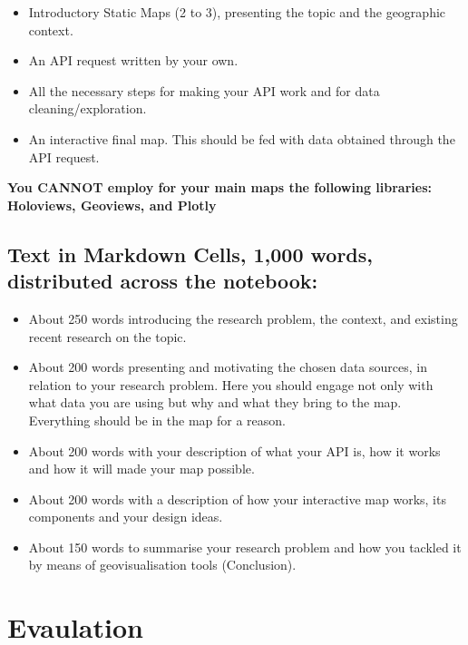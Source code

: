 \documentclass[
  letterpaper,
  DIV=11,
  numbers=noendperiod]{scrreprt}
\providecommand{\tightlist}{%
  \setlength{\itemsep}{0pt}\setlength{\parskip}{0pt}}\usepackage{longtable,booktabs,array}
\begin{document}
\begin{itemize}
\tightlist
\item
  Introductory Static Maps (2 to 3), presenting the topic and the
  geographic context.
\item
  An API request written by your own.
\item
  All the necessary steps for making your API work and for data
  cleaning/exploration.
\item
  An interactive final map. This should be fed with data obtained
  through the API request.
\end{itemize}

\textbf{You CANNOT employ for your main maps the following libraries:
Holoviews, Geoviews, and Plotly}

\subsection*{Text in Markdown Cells, 1,000 words, distributed across the
notebook:}\label{text-in-markdown-cells-1000-words-distributed-across-the-notebook}

\begin{itemize}
\tightlist
\item
  About 250 words introducing the research problem, the context, and
  existing recent research on the topic.
\item
  About 200 words presenting and motivating the chosen data sources, in
  relation to your research problem. Here you should engage not only
  with what data you are using but why and what they bring to the map.
  Everything should be in the map for a reason.
\item
  About 200 words with your description of what your API is, how it
  works and how it will made your map possible.
\item
  About 200 words with a description of how your interactive map works,
  its components and your design ideas.
\item
  About 150 words to summarise your research problem and how you tackled
  it by means of geovisualisation tools (Conclusion).
\end{itemize}

\section*{Evaulation}\label{evaulation}
\end{document}
